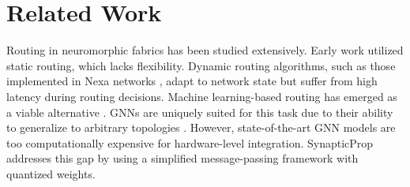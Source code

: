 \section{Related Work}
\label{sec:related}
Routing in neuromorphic fabrics has been studied extensively. Early work utilized static routing, which lacks flexibility. Dynamic routing algorithms, such as those implemented in Nexa networks \citep{rostova2022nexa}, adapt to network state but suffer from high latency during routing decisions. Machine learning-based routing has emerged as a viable alternative \citep{nakamura2023spiking}. GNNs are uniquely suited for this task due to their ability to generalize to arbitrary topologies \citep{vance2025vertex}. However, state-of-the-art GNN models are too computationally expensive for hardware-level integration. SynapticProp addresses this gap by using a simplified message-passing framework with quantized weights.
